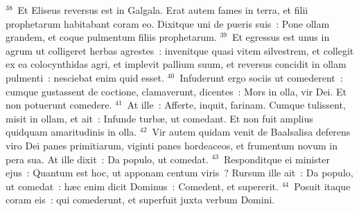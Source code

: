 ${}^{38}$~Et Eliseus reversus est in Galgala. Erat autem fames in terra, et filii prophetarum habitabant coram eo. Dixitque uni de pueris suis~: Pone ollam grandem, et coque pulmentum filiis prophetarum.
${}^{39}$~Et egressus est unus in agrum ut colligeret herbas agrestes~: invenitque quasi vitem silvestrem, et collegit ex ea colocynthidas agri, et implevit pallium suum, et reversus concidit in ollam pulmenti~: nesciebat enim quid esset.
${}^{40}$~Infuderunt ergo sociis ut comederent~: cumque gustassent de coctione, clamaverunt, dicentes~: Mors in olla, vir Dei. Et non potuerunt comedere.
${}^{41}$~At ille~: Afferte, inquit, farinam. Cumque tulissent, misit in ollam, et ait~: Infunde turb\ae , ut comedant. Et non fuit amplius quidquam amaritudinis in olla.
${}^{42}$~Vir autem quidam venit de Baalsalisa deferens viro Dei panes primitiarum, viginti panes hordeaceos, et frumentum novum in pera sua. At ille dixit~: Da populo, ut comedat.
${}^{43}$~Responditque ei minister ejus~: Quantum est hoc, ut apponam centum viris~? Rursum ille ait~: Da populo, ut comedat~: h\ae c enim dicit Dominus~: Comedent, et supererit.
${}^{44}$~Posuit itaque coram eis~: qui comederunt, et superfuit juxta verbum Domini.

